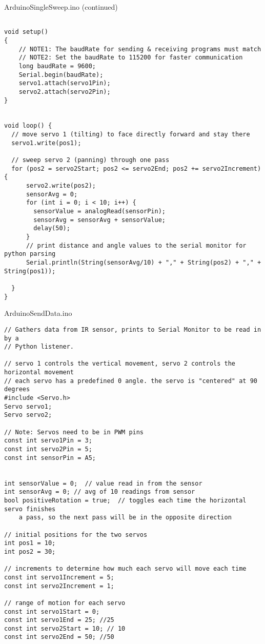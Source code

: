 \documentclass{article}
\begin{document}
\begin{tcolorbox}
ArduinoSingleSweep.ino (continued)
\begin{verbatim}

void setup()
{
    // NOTE1: The baudRate for sending & receiving programs must match
    // NOTE2: Set the baudRate to 115200 for faster communication
    long baudRate = 9600;
    Serial.begin(baudRate);
    servo1.attach(servo1Pin);
    servo2.attach(servo2Pin);
}


void loop() {
  // move servo 1 (tilting) to face directly forward and stay there
  servo1.write(pos1);

  // sweep servo 2 (panning) through one pass
  for (pos2 = servo2Start; pos2 <= servo2End; pos2 += servo2Increment) {
      servo2.write(pos2);
      sensorAvg = 0;
      for (int i = 0; i < 10; i++) {
        sensorValue = analogRead(sensorPin);
        sensorAvg = sensorAvg + sensorValue;
        delay(50);
      }
      // print distance and angle values to the serial monitor for python parsing
      Serial.println(String(sensorAvg/10) + "," + String(pos2) + "," + String(pos1));
    
  }
}
\end{verbatim}
\end{tcolorbox}


\begin{tcolorbox}
ArduinoSendData.ino
\begin{verbatim}
// Gathers data from IR sensor, prints to Serial Monitor to be read in by a
// Python listener.

// servo 1 controls the vertical movement, servo 2 controls the horizontal movement
// each servo has a predefined 0 angle. the servo is "centered" at 90 degrees
#include <Servo.h>
Servo servo1;
Servo servo2;

// Note: Servos need to be in PWM pins
const int servo1Pin = 3;
const int servo2Pin = 5;
const int sensorPin = A5;


int sensorValue = 0;  // value read in from the sensor
int sensorAvg = 0; // avg of 10 readings from sensor
bool positiveRotation = true;  // toggles each time the horizontal servo finishes
    a pass, so the next pass will be in the opposite direction

// initial positions for the two servos
int pos1 = 10;
int pos2 = 30;

// increments to determine how much each servo will move each time
const int servo1Increment = 5;
const int servo2Increment = 1;

// range of motion for each servo
const int servo1Start = 0;
const int servo1End = 25; //25
const int servo2Start = 10; // 10
const int servo2End = 50; //50
\end{verbatim}
\end{tcolorbox}
\end{document}
